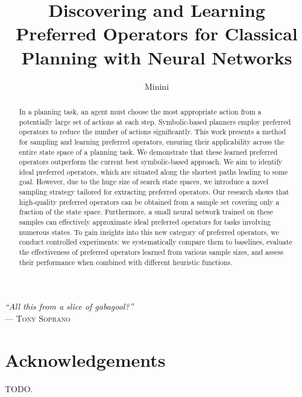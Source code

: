 \documentclass[ppgc,diss,english]{iiufrgs}
\title{Discovering and Learning Preferred Operators for Classical Planning with Neural Networks}
\author{Minini}{Pedro Probst}
\begin{document}
\maketitle

\clearpage
\begin{flushright}
\mbox{}\vfill
{\sffamily\itshape
    ``All this from a slice of gabagool?''\\}
--- \textsc{Tony Soprano}
\end{flushright}

\chapter*{Acknowledgements}
TODO.

\begin{abstract}
In a planning task, an agent must choose the most appropriate action from a potentially large set of actions at each step. Symbolic-based planners employ preferred operators to reduce the number of actions significantly. This work presents a method for sampling and learning preferred operators, ensuring their applicability across the entire state space of a planning task. We demonstrate that these learned preferred operators outperform the current best symbolic-based approach.
We aim to identify ideal preferred operators, which are situated along the shortest paths leading to some goal. However, due to the huge size of search state spaces, we introduce a novel sampling strategy tailored for extracting preferred operators. Our research shows that high-quality preferred operators can be obtained from a sample set covering only a fraction of the state space. Furthermore, a small neural network trained on these samples can effectively approximate ideal preferred operators for tasks involving numerous states.
To gain insights into this new category of preferred operators, we conduct controlled experiments: we systematically compare them to baselines, evaluate the effectiveness of preferred operators learned from various sample sizes, and assess their performance when combined with different heuristic functions.
\end{abstract}
\end{document}
